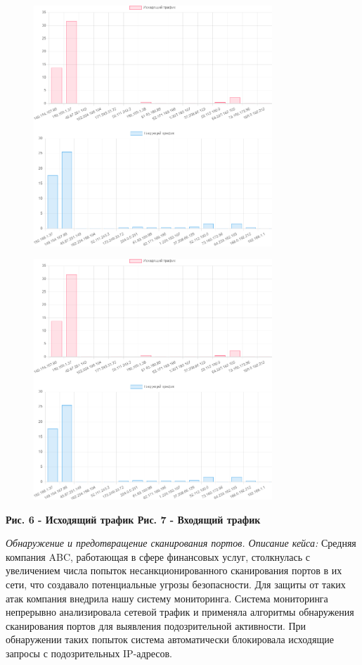 \begin{figure}[H]
	\centering
	\includegraphics[width=0.8\textwidth]{assets/52}
	\caption*{}
\end{figure}\begin{figure}[H]
	\centering
	\includegraphics[width=0.8\textwidth]{assets/52}
	\caption*{}
\end{figure}

\textbf{Рис. 6 - Исходящий трафик Рис. 7 - Входящий трафик}

\emph{Обнаружение и предотвращение сканирования портов. Описание кейса:}
Средняя компания ABC, работающая в сфере финансовых услуг, столкнулась с
увеличением числа попыток несанкционированного сканирования портов в их
сети, что создавало потенциальные угрозы безопасности. Для защиты от
таких атак компания внедрила нашу систему мониторинга. Система
мониторинга непрерывно анализировала сетевой трафик и применяла
алгоритмы обнаружения сканирования портов для выявления подозрительной
активности. При обнаружении таких попыток система автоматически
блокировала исходящие запросы с подозрительных IP-адресов.

